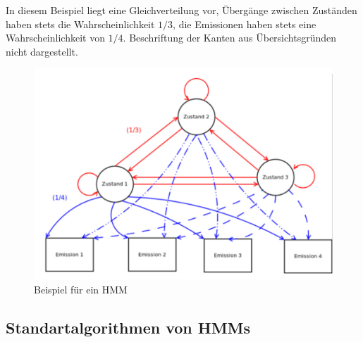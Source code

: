 In diesem Beispiel liegt eine Gleichverteilung vor, Übergänge zwischen Zuständen haben stets die Wahrscheinlichkeit $1/3$, die Emissionen haben stets eine Wahrscheinlichkeit von $1/4$.
Beschriftung der Kanten aus Übersichtsgründen nicht dargestellt.
\begin{figure}[H]
	\centering
	\includegraphics[width=1\textwidth]{bilder/02_hmm.pdf}
	\caption{Beispiel für ein HMM}
	\label{fig:hmm}
\end{figure}

\subsection{Standartalgorithmen von HMMs}
\label{sec:standartalgorithmenHMM}

